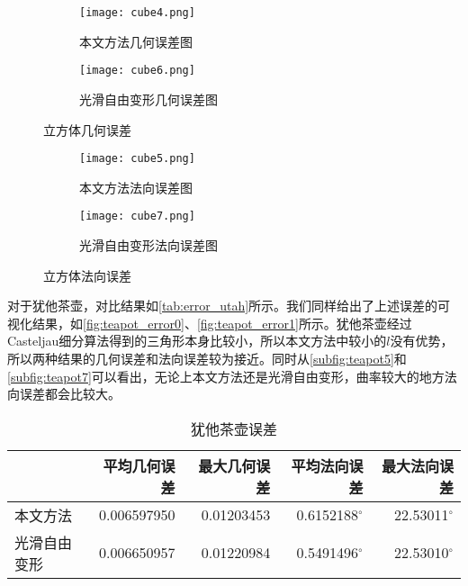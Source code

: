 \begin{figure}[htbp]
	\centering
	\begin{subfigure}[b]{.45\textwidth}
		\centering
		\texttt{[image: cube4.png]}
		\caption{本文方法几何误差图}\label{subfig:cube4}
	\end{subfigure}%
	\begin{subfigure}[b]{.45\textwidth}
		\centering
		\texttt{[image: cube6.png]}
		\caption{光滑自由变形几何误差图}\label{subfig:cube6}
	\end{subfigure}
	\caption{立方体几何误差}\label{fig:cube_error0}
\end{figure}
\begin{figure}[htbp]
	\centering
	\begin{subfigure}[b]{.45\textwidth}
		\centering
		\texttt{[image: cube5.png]}
		\caption{本文方法法向误差图}\label{subfig:cube5}
	\end{subfigure}%
	\begin{subfigure}[b]{.45\textwidth}
		\centering
		\texttt{[image: cube7.png]}
		\caption{光滑自由变形法向误差图}\label{subfig:cube7}
	\end{subfigure}
	\caption{立方体法向误差}\label{fig:cube_error1}
\end{figure}

对于犹他茶壶，对比结果如\autoref{tab:error_utah}所示。我们同样给出了上述误差的可视化结果，如\autoref{fig:teapot_error0}、\autoref{fig:teapot_error1}所示。犹他茶壶经过Casteljau细分算法得到的三角形本身比较小，所以本文方法中较小的$l$没有优势，所以两种结果的几何误差和法向误差较为接近。同时从\autoref{subfig:teapot5}和\autoref{subfig:teapot7}可以看出，无论上本文方法还是光滑自由变形，曲率较大的地方法向误差都会比较大。

\begin{table}[htbp]
    \centering
    \begin{tabular}{lrrrr}
    \toprule
        & 平均几何误差 & 最大几何误差 & 平均法向误差 & 最大法向误差 \\
    \midrule
        本文方法    & \num{0.006597950} & \num{0.01203453} & \num[scientific-notation=false]{0.6152188}$^\circ$ & \num[scientific-notation=false]{22.53011}$^\circ$ \\
        光滑自由变形& \num{0.006650957} & \num{0.01220984} & \num[scientific-notation=false]{0.5491496}$^\circ$ & \num[scientific-notation=false]{22.53010}$^\circ$ \\
    \bottomrule
    \end{tabular}
    \caption{犹他茶壶误差} \label{tab:error_utah}
\end{table}

